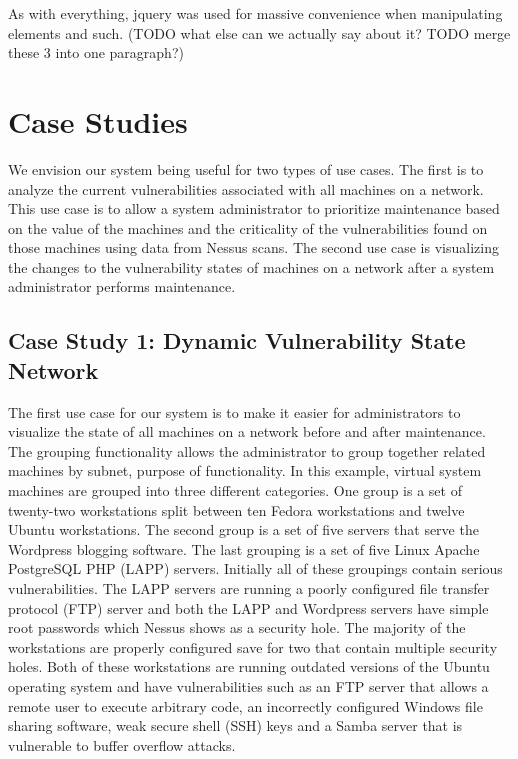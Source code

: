 \documentclass{acm_proc_article-sp}
\begin{document}
As with everything, jquery was used for massive convenience when manipulating elements and such.
(TODO what else can we actually say about it?  TODO merge these 3 into one paragraph?)

\section{Case Studies}
We envision our system being useful for two types of use cases. The first is to
analyze the current vulnerabilities associated with all machines on a network.
This use case is to allow a system administrator to prioritize maintenance based
on the value of the machines and the criticality of the vulnerabilities found on
those machines using data from Nessus scans. The second use case is visualizing 
the changes to the vulnerability states of machines on a network after a system
administrator performs maintenance.



\subsection{Case Study 1: Dynamic Vulnerability State Network }
The first use case for our system is to make it easier for administrators to
visualize the state of all machines on a network before and after maintenance. 
The grouping functionality allows
the administrator to group together related machines by subnet, purpose of
functionality. In this example, virtual system machines are grouped into three
different categories. One group is a set of twenty-two workstations split
between ten Fedora workstations and twelve Ubuntu workstations. The second group is
a set of five servers that serve the Wordpress blogging software.  The last
grouping is a set of five Linux Apache PostgreSQL PHP (LAPP) servers.
Initially all of these groupings contain serious vulnerabilities.
The LAPP servers are running a poorly configured file transfer protocol (FTP) server
and both the LAPP and Wordpress servers have simple root passwords
which Nessus shows as a security hole. The majority of the workstations are properly configured
save for two that contain multiple security holes. Both of these workstations are
running outdated versions of the Ubuntu operating system and have
vulnerabilities such as an FTP server that allows a remote user to execute
arbitrary code, an incorrectly configured Windows file sharing software, weak secure shell
(SSH) keys and a Samba server that is vulnerable to buffer overflow attacks.
\end{document}
